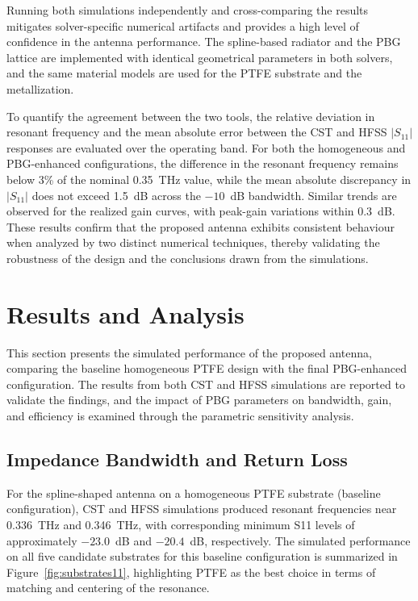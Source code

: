 \documentclass[a4paper,fleqn]{cas-dc}
\begin{document}
Running both simulations independently and cross-comparing the results mitigates solver-specific numerical artifacts and provides a high level of confidence in the antenna performance. The spline-based radiator and the PBG lattice are implemented with identical geometrical parameters in both solvers, and the same material models are used for the PTFE substrate and the metallization.

To quantify the agreement between the two tools, the relative deviation in resonant frequency and the mean absolute error between the CST and HFSS $\lvert S_{11} \rvert$ responses are evaluated over the operating band. For both the homogeneous and PBG-enhanced configurations, the difference in the resonant frequency remains below 3\% of the nominal 0.35~THz value, while the mean absolute discrepancy in $\lvert S_{11} \rvert$ does not exceed 1.5~dB across the \(-10\)~dB bandwidth. Similar trends are observed for the realized gain curves, with peak-gain variations within 0.3~dB. These results confirm that the proposed antenna exhibits consistent behaviour when analyzed by two distinct numerical techniques, thereby validating the robustness of the design and the conclusions drawn from the simulations.

\section{Results and Analysis}
\label{sec:results}

This section presents the simulated performance of the proposed antenna, comparing the baseline homogeneous PTFE design with the final PBG-enhanced configuration. The results from both CST and HFSS simulations are reported to validate the findings, and the impact of PBG parameters on bandwidth, gain, and efficiency is examined through the parametric sensitivity analysis.

\subsection{Impedance Bandwidth and Return Loss}
\label{subsec:s11_bw}

For the spline-shaped antenna on a homogeneous PTFE substrate (baseline configuration), CST and HFSS simulations produced resonant frequencies near 0.336~THz and 0.346~THz, with corresponding minimum S11 levels of approximately $-23.0$~dB and $-20.4$~dB, respectively. The simulated performance on all five candidate substrates for this baseline configuration is summarized in Figure~\ref{fig:substrates11}, highlighting PTFE as the best choice in terms of matching and centering of the resonance.
\end{document}
